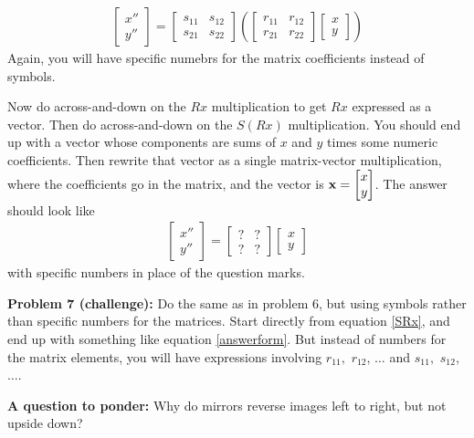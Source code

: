 \documentclass[letter]{article}
\newcommand{\bx}{{\bf x}}
\begin{document}
\begin{align}
  \begin{bmatrix} x'' \\ y'' \end{bmatrix}
                        =
  \begin{bmatrix} s_{11} & s_{12} \\ s_{21} & s_{22} \end{bmatrix}
  \left(\begin{bmatrix} r_{11} & r_{12} \\ r_{21} & r_{22} \end{bmatrix}
  \begin{bmatrix} x \\ y \end{bmatrix} \right) \label{SRx}
\end{align}
Again, you will have specific numebrs for the matrix coefficients instead of symbols.

\vspace{4mm}
Now do across-and-down on the $Rx$ multiplication to get $Rx$ expressed as a vector.
Then do across-and-down on the $S (Rx)$ multiplication. You should end up with a vector
whose components are sums of $x$ and $y$ times some numeric coefficients. Then rewrite
that vector as a single matrix-vector multiplication, where the coefficients go in the matrix,
and the vector is $\bx = \begin{bmatrix} x \\ y \end{bmatrix}$. The answer should look like
\begin{align}
  \begin{bmatrix} x'' \\ y'' \end{bmatrix}
                        =
  \begin{bmatrix} ? & ? \\ ? & ? \end{bmatrix}
  \begin{bmatrix} x \\ y \end{bmatrix} \label{answerform}
\end{align} 
with specific numbers in place of the question marks.
\newpage

\vspace{4mm}
{\bf Problem 7 (challenge):} Do the same as in problem 6, but using symbols rather than
specific numbers for the matrices. Start directly from equation \ref{SRx}, and end up
with something like equation \ref{answerform}. But instead of numbers for the matrix elements,
you will have expressions involving $r_{11},$ $r_{12}$, $\ldots$ and $s_{11},$ $s_{12}$, $\ldots$.


\vspace{180mm}
{\bf A question to ponder:} Why do mirrors reverse images left to right, but not upside down?
\end{document}
